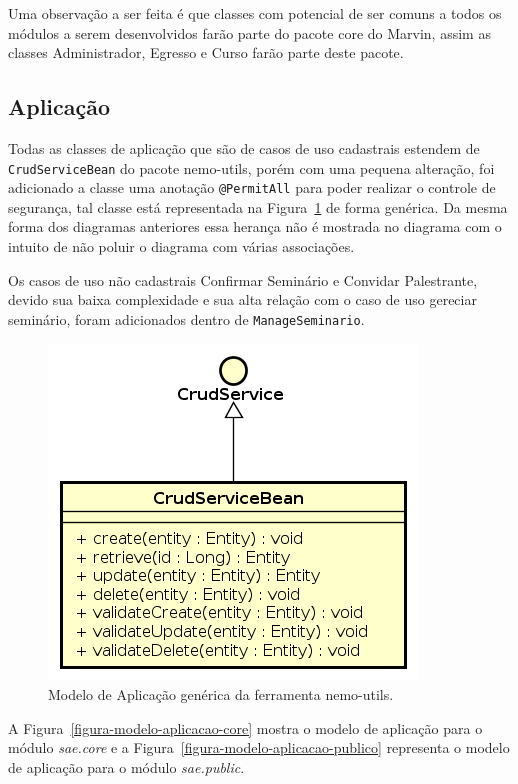 Uma observação a ser feita é que classes com potencial de ser comuns a todos os módulos a serem desenvolvidos farão parte do pacote core do Marvin, assim as classes Administrador, Egresso e Curso farão parte deste pacote.







\newpage
\subsection{Aplicação}
Todas as classes de aplicação que são de casos de uso cadastrais estendem de \texttt{CrudServiceBean} do pacote nemo-utils, porém com uma pequena alteração, foi adicionado a classe uma anotação \texttt{@PermitAll} para poder realizar o controle de segurança, tal classe está representada na Figura~\ref{figura-modelo-aplicacao-generico} de forma genérica. Da mesma forma dos diagramas anteriores essa herança não é mostrada no diagrama com o intuito de não poluir o diagrama com várias associações. 

Os casos de uso não cadastrais Confirmar Seminário e Convidar Palestrante, devido sua baixa complexidade e sua alta relação com o caso de uso gereciar seminário, foram adicionados dentro de \texttt{ManageSeminario}.

\begin{figure}[!h]
  \centering
  \includegraphics[scale=0.45]{figuras/crudservicebean.png}
  \caption{Modelo de Aplicação genérica da ferramenta nemo-utils.}
  \label{figura-modelo-aplicacao-generico}
\end{figure}

A Figura~\ref{figura-modelo-aplicacao-core} mostra o modelo de aplicação para o módulo \textit{sae.core} e a Figura~\ref{figura-modelo-aplicacao-publico} representa o modelo de aplicação para o módulo \textit{sae.public}.

